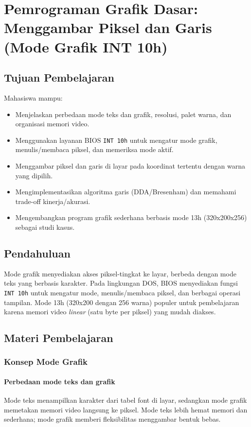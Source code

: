 \chapter{Pemrograman Grafik Dasar: Menggambar Piksel dan Garis (Mode Grafik INT 10h)}

\section{Tujuan Pembelajaran}
Mahasiswa mampu:
\begin{itemize}
  \item Menjelaskan perbedaan mode teks dan grafik, resolusi, palet warna, dan organisasi memori video.
  \item Menggunakan layanan BIOS \texttt{INT 10h} untuk mengatur mode grafik, menulis/membaca piksel, dan memeriksa mode aktif.
  \item Menggambar piksel dan garis di layar pada koordinat tertentu dengan warna yang dipilih.
  \item Mengimplementasikan algoritma garis (DDA/Bresenham) dan memahami trade-off kinerja/akurasi.
  \item Mengembangkan program grafik sederhana berbasis mode 13h (320x200x256) sebagai studi kasus.
\end{itemize}

\section{Pendahuluan}
Mode grafik menyediakan akses piksel-tingkat ke layar, berbeda dengan mode teks yang berbasis karakter. Pada lingkungan DOS, BIOS menyediakan fungsi \texttt{INT 10h} untuk mengatur mode, menulis/membaca piksel, dan berbagai operasi tampilan. Mode 13h (320x200 dengan 256 warna) populer untuk pembelajaran karena memori video \textit{linear} (satu byte per piksel) yang mudah diakses.

\section{Materi Pembelajaran}
\subsection{Konsep Mode Grafik}
\subsubsection{Perbedaan mode teks dan grafik}
Mode teks menampilkan karakter dari tabel font di layar, sedangkan mode grafik memetakan memori video langsung ke piksel. Mode teks lebih hemat memori dan sederhana; mode grafik memberi fleksibilitas menggambar bentuk bebas.

